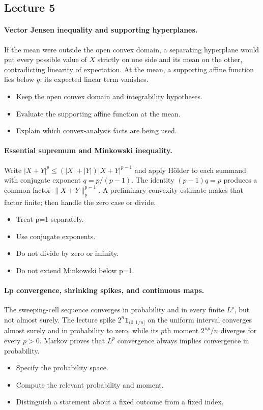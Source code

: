 \documentclass[11pt,letterpaper]{article}
\begin{document}
\subsection{Lecture 5}
\hypertarget{answer-l5-s3}{}\paragraph{Vector Jensen inequality and supporting hyperplanes.}
If the mean were outside the open convex domain, a separating hyperplane would put every possible value of $X$ strictly on one side and its mean on the other, contradicting linearity of expectation. At the mean, a supporting affine function lies below $g$; its expected linear term vanishes.
\begin{itemize}
\item Keep the open convex domain and integrability hypotheses.
\item Evaluate the supporting affine function at the mean.
\item Explain which convex-analysis facts are being used.
\end{itemize}
\hypertarget{answer-l5-s6}{}\paragraph{Essential supremum and Minkowski inequality.}
Write $|X+Y|^p\le(|X|+|Y|)|X+Y|^{p-1}$ and apply Hölder to each summand with conjugate exponent $q=p/(p-1)$. The identity $(p-1)q=p$ produces a common factor $\|X+Y\|_p^{p-1}$. A preliminary convexity estimate makes that factor finite; then handle the zero case or divide.
\begin{itemize}
\item Treat p=1 separately.
\item Use conjugate exponents.
\item Do not divide by zero or infinity.
\item Do not extend Minkowski below p=1.
\end{itemize}
\hypertarget{answer-l5-s10}{}\paragraph{Lp convergence, shrinking spikes, and continuous maps.}
The sweeping-cell sequence converges in probability and in every finite $L^p$, but not almost surely. The lecture spike $2^n\mathbf1_{(0,1/n]}$ on the uniform interval converges almost surely and in probability to zero, while its $p$th moment $2^{np}/n$ diverges for every $p>0$. Markov proves that $L^p$ convergence always implies convergence in probability.
\begin{itemize}
\item Specify the probability space.
\item Compute the relevant probability and moment.
\item Distinguish a statement about a fixed outcome from a fixed index.
\end{itemize}
\end{document}
